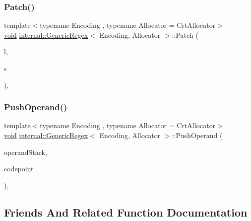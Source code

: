 \subsubsection{\texorpdfstring{Patch()}{Patch()}}
{\footnotesize\ttfamily template$<$typename Encoding , typename Allocator  = Crt\+Allocator$>$ \\
\hyperlink{imgui__impl__opengl3__loader_8h_ac668e7cffd9e2e9cfee428b9b2f34fa7}{void} \hyperlink{classinternal_1_1GenericRegex}{internal\+::\+Generic\+Regex}$<$ Encoding, Allocator $>$\+::Patch (\begin{DoxyParamCaption}\item[{\hyperlink{rapidjson_8h_a5ed6e6e67250fadbd041127e6386dcb5}{Size\+Type}}]{l,  }\item[{\hyperlink{rapidjson_8h_a5ed6e6e67250fadbd041127e6386dcb5}{Size\+Type}}]{s }\end{DoxyParamCaption})\hspace{0.3cm}{\ttfamily [inline]}, {\ttfamily [private]}}

\mbox{\label{classinternal_1_1GenericRegex_a1a3ea65f584e0dba5815a1232f9a770e}} 
\subsubsection{\texorpdfstring{Push\+Operand()}{PushOperand()}}
{\footnotesize\ttfamily template$<$typename Encoding , typename Allocator  = Crt\+Allocator$>$ \\
\hyperlink{imgui__impl__opengl3__loader_8h_ac668e7cffd9e2e9cfee428b9b2f34fa7}{void} \hyperlink{classinternal_1_1GenericRegex}{internal\+::\+Generic\+Regex}$<$ Encoding, Allocator $>$\+::Push\+Operand (\begin{DoxyParamCaption}\item[{\hyperlink{classinternal_1_1Stack}{Stack}$<$ Allocator $>$ \&}]{operand\+Stack,  }\item[{unsigned}]{codepoint }\end{DoxyParamCaption})\hspace{0.3cm}{\ttfamily [inline]}, {\ttfamily [private]}}



\subsection{Friends And Related Function Documentation}
\mbox{\label{classinternal_1_1GenericRegex_a919008cc046ab9f1c09609f1fc143986}} 
